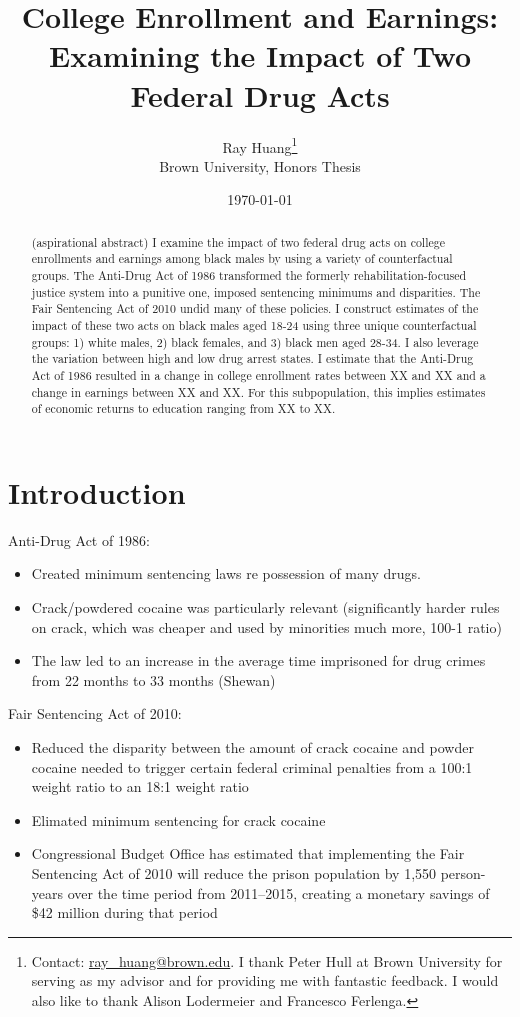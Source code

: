 \documentclass{article}
\title{College Enrollment and Earnings:
\texorpdfstring{\\}{} Examining the Impact of Two Federal Drug Acts}
\author{Ray Huang\thanks{Contact:
    \href{mailto:ray_huang@brown.edu}{ray\_huang@brown.edu}.
     I thank Peter Hull at Brown University for serving as my advisor and for providing me with fantastic feedback. I would also like to thank Alison Lodermeier and Francesco Ferlenga.}
     \\Brown University, Honors Thesis}
\date{\today}
\begin{document}
\maketitle

\begin{abstract}
\noindent (aspirational abstract) I examine the impact of two federal drug acts on college enrollments and earnings among black males by using a variety of counterfactual groups. The Anti-Drug Act of 1986 transformed the formerly rehabilitation-focused justice system into a punitive one, imposed sentencing minimums and disparities. The Fair Sentencing Act of 2010 undid many of these policies. I construct estimates of the impact of these two acts on black males aged 18-24 using three unique counterfactual groups: 1) white males, 2) black females, and 3) black men aged 28-34. I also leverage the variation between high and low drug arrest states. I estimate that the Anti-Drug Act of 1986 resulted in a change in college enrollment rates between XX and XX and a change in earnings between XX and XX. For this subpopulation, this implies estimates of economic returns to education ranging from XX to XX.

\end{abstract}

\clearpage

\section*{Introduction}

Anti-Drug Act of 1986:
\begin{itemize}[itemsep=0.05mm, parsep=0pt]
  \item Created minimum sentencing laws re possession of many drugs. 
  \item Crack/powdered cocaine was particularly relevant (significantly harder rules on crack, which was cheaper and used by minorities much more, 100-1 ratio)
  \item The law led to an increase in the average time imprisoned for drug crimes from 22 months to 33 months (Shewan)
\end{itemize}


Fair Sentencing Act of 2010:
\begin{itemize}[itemsep=0.05mm, parsep=0pt]
  \item Reduced the disparity between the amount of crack cocaine and powder cocaine needed to trigger certain federal criminal penalties from a 100:1 weight ratio to an 18:1 weight ratio 
  \item Elimated minimum sentencing for crack cocaine 
  \item Congressional Budget Office has estimated that implementing the Fair Sentencing Act of 2010 will reduce the prison population by 1,550 person-years over the time period from 2011–2015, creating a monetary savings of \$42 million during that period 
\end{itemize}
\end{document}
